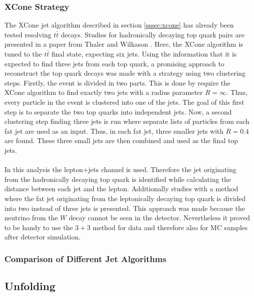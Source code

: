 \subsubsection{XCone Strategy}
	The XCone jet algorithm described in section \ref{sssec:xcone} has already been tested resolving $t\bar{t}$ decays. Studies for hadronically decaying top quark pairs are presented in a paper from Thaler and Wilkason \cite{xconetop}. Here, the XCone algorithm is tuned to the $t\bar{t}$ final state, expecting six jets. Using the information that it is expected to find three jets from each top quark, a promising approach to reconstruct the top quark decays was made with a strategy using two clustering steps. Firstly, the event is divided in two parts. This is done by require the XCone algorithm to find exactly two jets with a radius parameter $R=\infty$. Thus, every particle in the event is clustered into one of the jets. The goal of this first step is to separate the two top quarks into independent jets. Now, a second clustering step finding three jets is run where separate lists of particles from each fat jet are used as an input. Thus, in each fat jet, three smaller jets with $R=0.4$ are found. These three small jets are then combined and used as the final top jets. \\
	\\ In this analysis the lepton+jets channel is used. Therefore the jet originating from the hadronically decaying top quark is identified while calculating the distance between each jet and the lepton. Additionally studies with a method where the fat jet originating from the leptonically decaying top quark is divided into two instead of three jets is presented. This approach was made because the neutrino from the $W$ decay cannot be seen in the detector. Nevertheless it proved to be handy to use the $3+3$ method for data and therefore also for MC samples after detector simulation.   
	
\subsubsection{Comparison of Different Jet Algorithms}
\subsection{Unfolding}